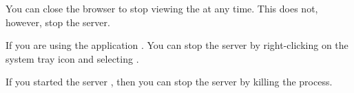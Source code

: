 You can close the browser to stop viewing the \dash{} at any time. This does not, however, stop the \dash{} server. 

If you are using the \dash{} application . You can stop the \dash{} server by right-clicking on the system tray icon and selecting . 

If you started the \dash{} server , then you can stop the \dash{} server by killing the process. 
